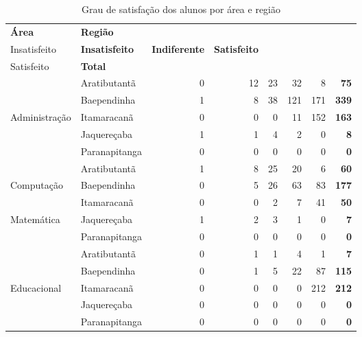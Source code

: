 \begin{table}[h]
\footnotesize
\centering
\caption{Grau de satisfação dos alunos por área e região}
\vspace{0.5em}
\label{tabela:q15}
\begin{tabular}{ll rrrrrr}
  \toprule
  \textbf{Área}        	& \textbf{Região} &  \textbf{\specialcell{c}{Muito\\Insatisfeito}} &  \textbf{Insatisfeito} &  \textbf{ Indiferente} &  \textbf{ Satisfeito} & \textbf{\specialcell{c}{Muito\\Satisfeito}} & \textbf{Total} \\
   \midrule
						& Aratibutantã    &   0 &  12 &  23 &  32 &   8 &  \textbf{75}\\ 
                          & Baependinha   &   1 &   8 &  38 & 121 & 171 & \textbf{339}\\ 
   Administração          & Itamaracanã   &   0 &   0 &   0 &  11 & 152 & \textbf{163}\\ 
                          & Jaquereçaba   &   1 &   1 &   4 &   2 &   0 &   \textbf{8}\\ 
                          & Paranapitanga &   0 &   0 &   0 &   0 &   0 &   \textbf{0}\\ 
\midrule
					& Aratibutantã        &   1 &   8 &  25 &  20 &   6 &  \textbf{60}\\ 
	Computação         	& Baependinha     &   0 &   5 &  26 &  63 &  83 & \textbf{177}\\ 
	\specialcell{c}{e}  & Itamaracanã     &   0 &   0 &   2 &   7 &  41 &  \textbf{50}\\ 
	Matemática          & Jaquereçaba     &   1 &   2 &   3 &   1 &   0 &   \textbf{7}\\ 
                        & Paranapitanga   &   0 &   0 &   0 &   0 &   0 &   \textbf{0}\\ 
\midrule
					& Aratibutantã        &   0 &   1 &   1 &   4 &   1 &  \textbf{7}\\ 
                          & Baependinha   &   0 &   1 &   5 &  22 &  87 & \textbf{115}\\ 
  Educacional             & Itamaracanã   &   0 &   0 &   0 &   0 & 212 & \textbf{212}\\ 
                          & Jaquereçaba   &   0 &   0 &   0 &   0 &   0 &   \textbf{0}\\ 
                          & Paranapitanga &   0 &   0 &   0 &   0 &   0 &   \textbf{0}\\ 

\end{tabular}
\end{table}
